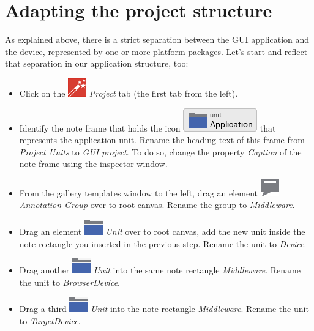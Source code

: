 \documentclass[
  a4paper,
,tablecaptionabove
]{scrbook}
\begin{document}
\hypertarget{_adapting_the_project_structure}{%
\section{Adapting the project
structure}\label{_adapting_the_project_structure}}

As explained above, there is a strict separation between the GUI
application and the device, represented by one or more platform
packages. Let's start and reflect that separation in our application
structure, too:

\begin{itemize}
\item
  Click on the
  \includegraphics{./../asciidoc/modules/ROOT/assets/images/icons/EmbeddedWizardIcon.png}
  \emph{Project} tab (the first tab from the left).
\item
  Identify the note frame that holds the icon
  \includegraphics{./../asciidoc/modules/ROOT/assets/images/icons/ApplicationUnitIcon.png}
  that represents the application unit. Rename the heading text of this
  frame from \emph{Project Units} to \emph{GUI project}. To do so,
  change the property \emph{Caption} of the note frame using the
  inspector window.
\item
  From the gallery templates window to the left, drag an element
  \includegraphics{./../asciidoc/modules/ROOT/assets/images/icons/AnnotationGroupIcon.png}
  \emph{Annotation Group} over to root canvas. Rename the group to
  \emph{Middleware}.
\item
  Drag an element
  \includegraphics{./../asciidoc/modules/ROOT/assets/images/icons/UnitIcon.png}
  \emph{Unit} over to root canvas, add the new unit inside the note
  rectangle you inserted in the previous step. Rename the unit to
  \emph{Device}.
\item
  Drag another
  \includegraphics{./../asciidoc/modules/ROOT/assets/images/icons/UnitIcon.png}
  \emph{Unit} into the same note rectangle \emph{Middleware}. Rename the
  unit to \emph{BrowserDevice}.
\item
  Drag a third
  \includegraphics{./../asciidoc/modules/ROOT/assets/images/icons/UnitIcon.png}
  \emph{Unit} into the note rectangle \emph{Middleware}. Rename the unit
  to \emph{TargetDevice}.
\end{itemize}
\end{document}

